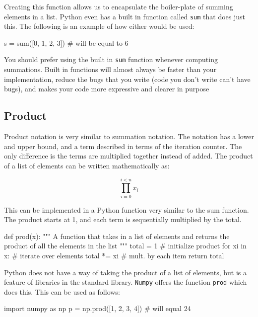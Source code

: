 \documentclass{../../KDHnotes}
\begin{document}
Creating this function allows us to encapsulate the boiler-plate of summing elements in a list. Python even has a built in function called \texttt{sum} that does just this. The following is an example of how either would be used:

\begin{python}
s = sum([0, 1, 2, 3]) # will be equal to 6
\end{python}

You should prefer using the built in \texttt{sum} function whenever computing summations. Built in functions will almost always be faster than your implementation, reduce the bugs that you write (code you don't write can't have bugs), and makes your code more expressive and clearer in purpose

\subsection{Product}

Product notation is very similar to summation notation. The notation has a lower and upper bound, and a term described in terms of the iteration counter. The only difference is the terms are multiplied together instead of added. The product of a list of elements can be written mathematically as:

\begin{equation}
	\prod_{i=0}^{i<n} x_i
\end{equation}

This can be implemented in a Python function very similar to the sum function. The product starts at 1, and each term is sequentially multiplied by the total.

\begin{python}
def prod(x):
    """
    A function that takes in a list of elements and returns the product of all the elements in the list    
    """
    total = 1         # initialize product
    for xi in x:      # iterate over elements
        total *= xi  # mult. by each item
    return total
\end{python}

Python does not have a way of taking the product of a list of elements, but is a feature of libraries in the standard library. \texttt{Numpy} offers the function \texttt{prod} which does this. This can be used as follows:

\begin{python}
import numpy as np
p = np.prod([1, 2, 3, 4]) # will equal 24
\end{python}
\end{document}
